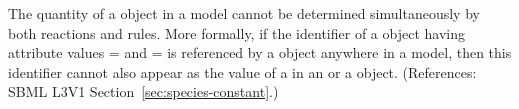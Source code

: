 The quantity of a \Species object in a model cannot be determined
simultaneously by both reactions and rules.  More formally, if the
identifier of a \Species object having attribute values
= and = is
referenced by a \SpeciesReference object anywhere in a model, then this
identifier cannot also appear as the value of a  in an
\AssignmentRule or a \RateRule object.  (References: SBML L3V1
Section~\ref{sec:species-constant}.)

